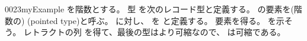\documentclass[index]{subfiles}
\begin{document}
\StartDefiningTabulars
\begin{myBlock}{0023}{myExample}
  を階数とする。
  型
  を次のレコード型と定義する。
  の要素を(階数の)
  (pointed type)と呼ぶ。
  に対し、
  を
  と定義する。
  要素を得る。
  を示そう。
  レトラクトの列
  を得て、最後の型はより可縮なので、
  は可縮である。
\end{myBlock}
\StopDefiningTabulars
\end{document}
